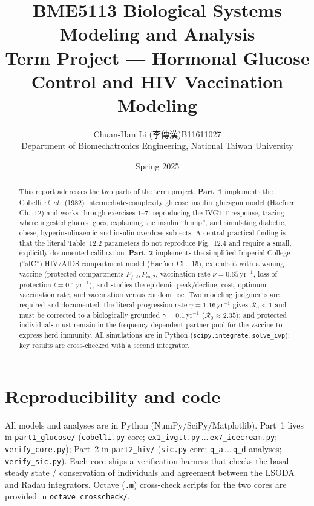 \documentclass[11pt]{article}
\title{\vspace{-1.2cm}\textbf{BME5113 Biological Systems Modeling and Analysis}\\[4pt]
\large Term Project --- Hormonal Glucose Control and HIV Vaccination Modeling}
\author{Chuan-Han Li (李傳漢)\quad B11611027\\ \small Department of Biomechatronics Engineering, National Taiwan University}
\date{Spring 2025}
\newcommand{\Rzero}{\mathcal{R}_0}
\begin{document}
\maketitle
\thispagestyle{empty}

\begin{abstract}
\noindent This report addresses the two parts of the term project. \textbf{Part~1} implements the
Cobelli \emph{et~al.}\ (1982) intermediate-complexity glucose--insulin--glucagon model (Haefner
Ch.~12) and works through exercises 1--7: reproducing the IVGTT response, tracing where ingested
glucose goes, explaining the insulin ``hump'', and simulating diabetic, obese, hyperinsulinaemic and
insulin-overdose subjects. A central practical finding is that the literal Table~12.2 parameters do
not reproduce Fig.~12.4 and require a small, explicitly documented calibration. \textbf{Part~2}
implements the simplified Imperial College (``sIC'') HIV/AIDS compartment model (Haefner Ch.~15),
extends it with a waning vaccine (protected compartments $P_{f,2},P_{m,2}$, vaccination rate
$\nu=0.65\,$yr$^{-1}$, loss of protection $l=0.1\,$yr$^{-1}$), and studies the epidemic peak/decline,
cost, optimum vaccination rate, and vaccination versus condom use. Two modeling judgments are
required and documented: the literal progression rate $\gamma=1.16\,$yr$^{-1}$ gives $\Rzero<1$ and
must be corrected to a biologically grounded $\gamma=0.1\,$yr$^{-1}$ ($\Rzero\approx2.35$); and
protected individuals must remain in the frequency-dependent partner pool for the vaccine to express
herd immunity. All simulations are in Python (\texttt{scipy.integrate.solve\_ivp}); key results are
cross-checked with a second integrator.
\end{abstract}

\tableofcontents
\vspace{0.6em}


\clearpage

\clearpage

\section{Reproducibility and code}
All models and analyses are in Python (NumPy/SciPy/Matplotlib). Part~1 lives in
\texttt{part1\_glucose/} (\texttt{cobelli.py} core; \texttt{ex1\_ivgtt.py}\,$\dots$\,\texttt{ex7\_icecream.py};
\texttt{verify\_core.py}); Part~2 in \texttt{part2\_hiv/} (\texttt{sic.py} core; \texttt{q\_a}\,$\dots$\,\texttt{q\_d}
analyses; \texttt{verify\_sic.py}). Each core ships a verification harness that checks the basal
steady state / conservation of individuals and agreement between the LSODA and Radau integrators.
Octave (\texttt{.m}) cross-check scripts for the two cores are provided in \texttt{octave\_crosscheck/}.
\end{document}
